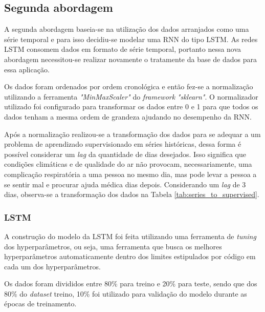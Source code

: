 \documentclass[
  12pt,		%
  a4paper,	%
  openright,%
  oneside,	%
  chapter=TITLE,		%
  section=TITLE,		%
  english,	%
  french,	%
  spanish,	%
  brazil	%
]{abntex2}
\begin{document}
    \subsection{Segunda abordagem}

    A segunda abordagem baseia-se na utilização dos dados arranjados como uma série temporal e para
    isso decidiu-se modelar uma RNN do tipo LSTM. As redes LSTM consomem dados em formato de série temporal, portanto
    nessa nova abordagem necessitou-se realizar novamente o tratamente da base de dados para essa aplicação.

    Os dados foram ordenados por ordem cronológica e então fez-se a normalização utilizando a ferramenta \textit{"MinMaxScaler"} do
    \textit{framework} \textit{"sklearn"}. O normalizador utilizado foi configurado para transformar os dados entre 0 e 1 
    para que todos os dados tenham a mesma ordem de grandeza ajudando no desempenho da RNN.

    Após a normalização realizou-se a transformação dos dados para se adequar a um problema de aprendizado
    supervisionado em séries históricas, dessa forma é possível considerar um \textit{lag} da quantidade de dias
    desejados. Isso significa que condições climáticas e de qualidade do ar não provocam, necessariamente, uma complicação
    respiratória a uma pessoa no mesmo dia, mas pode levar a pessoa a se sentir mal e procurar ajuda médica
    dias depois. Considerando um \textit{lag} de 3 dias, observa-se a transformação dos dados na Tabela \ref*{tab:series_to_supervised}.



    \subsubsection{LSTM}

    A construção do modelo da LSTM foi feita utilizando uma ferramenta de \textit{tuning} dos hyperparâmetros,
    ou seja, uma ferramenta que busca os melhores hyperparâmetros automaticamente dentro dos limites estipulados
    por código em cada um dos hyperparâmetros.

    Os dados foram divididos entre 80\% para treino e 20\% para teste, sendo que dos 80\% do \textit{dataset} treino,
    10\% foi utilizado para validação do modelo durante as épocas de treinamento.
\end{document}
